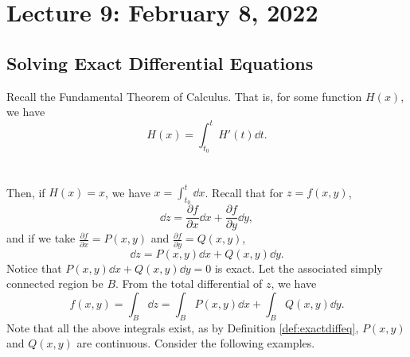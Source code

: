     \pagebreak

\section{Lecture 9: February 8, 2022}

    \subsection{Solving Exact Differential Equations}

        Recall the Fundamental Theorem of Calculus. That is, for some function \(H(x)\), we have
        \begin{equation*}
            H(x)=\int_{t_0}^t H'(t)\dd t.
        \end{equation*}
        \vphantom
        \\
        \\
        Then, if \(H(x)=x\), we have \(x=\int_{t_0}^t \dd x\). Recall that for \(z=f(x,y)\), 
        \begin{equation*}
            \dd z = \frac{\partial f}{\partial x}\dd x+\frac{\partial f}{\partial y} \dd y,
        \end{equation*}
        and if we take \(\frac{\partial f}{\partial x}=P(x,y)\) and \(\frac{\partial f}{\partial y}=Q(x,y)\),
        \begin{equation*}
            \dd z=P(x,y)\dd x+Q(x,y)\dd y.
        \end{equation*}
        Notice that \(P(x,y)\dd x+Q(x,y)\dd y=0\) is exact. Let the associated simply connected region be \(B\). From the total differential of \(z\), we have
        \begin{equation*}
            f(x,y)=\int_B \dd z=\int_B P(x,y)\dd x+\int_B Q(x,y)\dd y.
        \end{equation*}
        Note that all the above integrals exist, as by Definition \ref{def:exactdiffeq}, \(P(x,y)\) and \(Q(x,y)\) are continuous. Consider the following examples.
